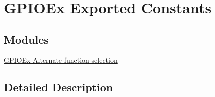 \hypertarget{group___g_p_i_o_ex___exported___constants}{\section{G\-P\-I\-O\-Ex Exported Constants}
\label{group___g_p_i_o_ex___exported___constants}
}
\subsection*{Modules}
\begin{DoxyCompactItemize}
\item 
\hyperlink{group___g_p_i_o_ex___alternate__function__selection}{G\-P\-I\-O\-Ex Alternate function selection}
\end{DoxyCompactItemize}


\subsection{Detailed Description}
